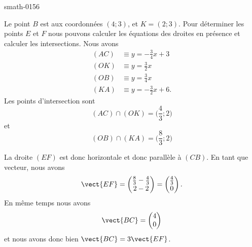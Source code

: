 
\begin{corrige}{smath-0156}

Le point \( B\) est aux coordonnées \( (4;3)\), et \( K=(2;3)\). Pour déterminer les points \( E\) et \( F\) nous pouvons calculer les équations des droites en présence et calculer les intersections. Nous avons
\begin{subequations}
    \begin{align}
        (AC)&\equiv y=-\frac{ 3 }{ 4 }x+3\\
        (OK)&\equiv y=\frac{ 3 }{2}x\\
        (OB)&\equiv y=\frac{ 3 }{ 4 }x\\
        (KA)&\equiv y=-\frac{ 3 }{2}x+6.
    \end{align}
\end{subequations}
Les points d'intersection sont 
\begin{equation}
    (AC)\cap (OK)=\big( \frac{ 4 }{ 3 };2 \big)
\end{equation}
et
\begin{equation}
    (OB)\cap (KA)=\big( \frac{ 8 }{ 3 };2 \big)
\end{equation}

La droite \( (EF) \) est donc horizontale et donc parallèle à \( (CB)\). En tant que vecteur, nous avons
\begin{equation}
    \vect{ EF }=\begin{pmatrix}
        \frac{ 8 }{ 3 }-\frac{ 4 }{ 3 }    \\ 
        2-2    
    \end{pmatrix}=\begin{pmatrix}
        \frac{ 4 }{ 3 }    \\ 
        0    
    \end{pmatrix}.
\end{equation}
En même temps nous avons
\begin{equation}
    \vect{ BC }=\begin{pmatrix}
        4    \\ 
        0    
    \end{pmatrix}
\end{equation}
et nous avons donc bien \( \vect{ BC }=3\vect{ EF }\).


\end{corrige}

